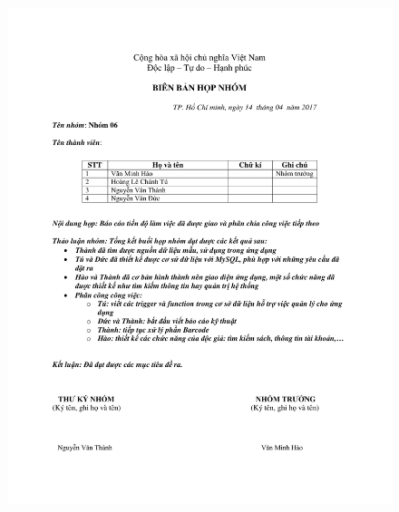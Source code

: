 \documentclass[12pt]{report}
\begin{document}
			\begin{figure}[H]
			\centering
			\includegraphics[scale=0.8]{images/hopnhomlan3.pdf}
			\end{figure}
\end{document}

